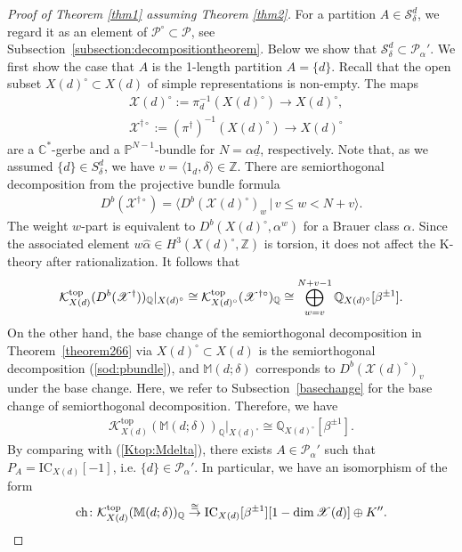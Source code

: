 \documentclass [11pt,oneside,a4paper,mathscr]{amsart}
\theoremstyle{definition}
\renewcommand{\leq}{\leqslant}
\newcommand{\X}{\mathscr{X}}
\newcommand{\ch}{\operatorname{ch}}
\newcommand{\dd}{\underline{d}}
\begin{document}
\begin{proof}[Proof of Theorem \ref{thm1} assuming Theorem \ref{thm2}]
For a partition $A \in \mathcal{S}_{\delta}^{d}$, we regard
it as an element of $\mathscr{P}^{\circ} \subset \mathscr{P}$, 
see Subsection~\ref{subsection:decompositiontheorem}. 
Below we show that $\mathcal{S}_{\delta}^{d} \subset \mathscr{P}_{\alpha}'$. 
We first show the case that $A$
is the 1-length partition $A=\{d\}$. 
Recall that the open subset 
$X(d)^{\circ} \subset X(d)$ of simple 
representations is non-empty. 
The maps 
\begin{align*}
    &\X(d)^{\circ}:=\pi_d^{-1}(X(d)^{\circ}) \to X(d)^{\circ}, \\ 
    &\X^{\dag\circ}:=(\pi^{\dag})^{-1}(X(d)^{\circ}) \to X(d)^{\circ}
\end{align*}
are a $\mathbb{C}^{\ast}$-gerbe and a 
$\mathbb{P}^{N-1}$-bundle for $N=\alpha \dd$, respectively. 
Note that, as we assumed $\{d\} \in S_{\delta}^{d}$, 
we have $v=\langle 1_d, \delta \rangle \in \mathbb{Z}$.
There are semiorthogonal decomposition from the projective bundle formula 
\begin{align}\label{sod:pbundle}
	D^b(\X^{\dag\circ})=\big\langle D^b(\X(d)^{\circ})_{w} \,\big|\, v\leq w <N+v \big\rangle. 
	\end{align}
The weight $w$-part is equivalent to 
$D^b(X(d)^{\circ}, \alpha^w)$ for a Brauer class $\alpha$. 
Since the associated element $
w\hat{\alpha} \in H^3(X(d)^{\circ}, \mathbb{Z})$ is torsion, 
it does not affect the K-theory after rationalization. 
It follows that 
\begin{align*}
	\mathcal{K}_{X(d)}^{\rm{top}}(D^b(\X^{\dag}))_{\mathbb{Q}}|_{X(d)^{\circ}}\cong
	\mathcal{K}_{X(d)^{\circ}}^{\mathrm{top}}(\X^{\dag\circ})_{\mathbb{Q}}\cong
	\bigoplus_{w=v}^{N+v-1}\mathbb{Q}_{X(d)^{\circ}}[\beta^{\pm 1}]. 
	\end{align*}
On the other hand, the base change of the semiorthogonal 
decomposition in Theorem~\ref{theorem266} via $X(d)^{\circ}\subset X(d)$ 
is the semiorthogonal decomposition (\ref{sod:pbundle}), and 
$\mathbb{M}(d; \delta)$ corresponds to $D^b(\X(d)^{\circ})_{v}$ under the 
base change. Here, we refer to Subsection~\ref{basechange}
for the base change of semiorthogonal decomposition. 
Therefore, we have 
\begin{align*}
	\mathcal{K}_{X(d)}^{\mathrm{top}}(\mathbb{M}(d; \delta))_{\mathbb{Q}}|_{X(d)^{\circ}} \cong 
	\mathbb{Q}_{X(d)^{\circ}}[\beta^{\pm 1}]. 
	\end{align*}
By comparing with (\ref{Ktop:Mdelta}),
there exists $A \in \mathscr{P}_{\alpha}'$ such that 
$P_A=\mathrm{IC}_{X(d)}[-1]$, i.e. $\{d\} \in \mathscr{P}_{\alpha}'$.  
In particular, 
we have an isomorphism of the form 
\begin{align}\label{decomp2}
	\ch \colon 
	\mathcal{K}_{X(d)}^{\rm{top}}(\mathbb{M}(d; \delta))_{\mathbb{Q}} \stackrel{\cong}{\to} \mathrm{IC}_{X(d)}[\beta^{\pm 1}][1-\dim \X(d)] \oplus K''. 
	\end{align}


\end{proof}
\end{document}
